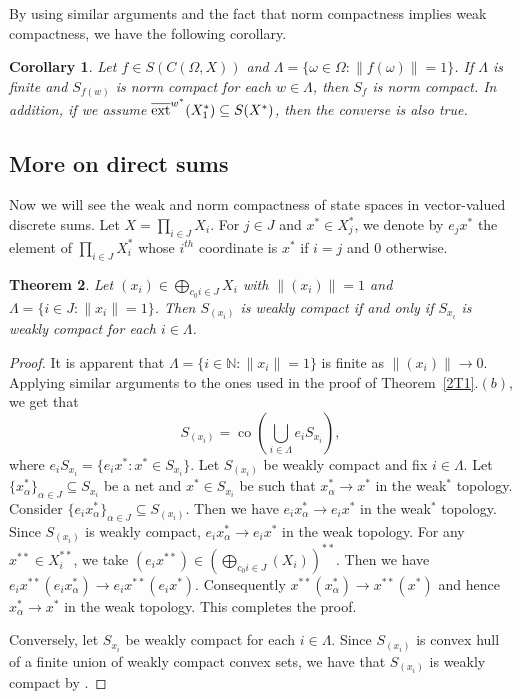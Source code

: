 \documentclass[12pt]{amsart}
\newtheorem{theorem}{Theorem}[section]
\newtheorem{corollary}[theorem]{Corollary}
\theoremstyle{definition}
\numberwithin{equation}{section}
\begin{document}
 By using similar arguments and the fact that norm compactness implies weak compactness, we have the following corollary.
\begin{corollary}
    Let $f \in S(C(\Omega,X))$ and $ \Lambda = \{ \omega \in \Omega : \|f(\omega)\| = 1 \} $. If $ \Lambda $ is finite and $S_{f(w)}$ is norm compact for each $w\in \Lambda$, then $ S_f $ is norm compact. In addition, if we assume $\overline{\textnormal{ext}}^{w^*}{(X_{1}^*)}\subseteq S(X^*)$, then the converse is also true.
\end{corollary}
\subsection{More on direct sums} Now we will see the weak and norm compactness of state spaces in vector-valued discrete sums. Let $X=\prod_{i\in J}X_{i}$. For $j\in J$ and $x^*\in X_{j}^*$, we denote by $e_{j}x^*$ the element of $\prod_{i\in J}X_{i}^*$ whose $i^{th}$ coordinate is $x^*$ if $i=j$ and $0$ otherwise.
\begin{theorem}
Let $(x_i) \in \bigoplus_{{c_0}{i\in J}}X_{i}$ with $\| (x_i) \| = 1$ and $\Lambda = \{ i \in J : \| x_i \| = 1 \}$. Then $ S_{(x_i)} $ is weakly compact if and only if $ S_{x_i} $ is weakly compact for each $ i \in \Lambda $.
\end{theorem}
\begin{proof}
It is apparent that $\Lambda = \{ i \in \mathbb{N} : \| x_i \| = 1 \}$ is finite as $\|(x_i)\|\rightarrow0$. Applying similar arguments to the ones used in the proof of Theorem~\ref{2T1}.$(b)$, we get that $$S_{(x_i)} = \operatorname{co} \left( \bigcup_{i \in \Lambda} e_iS_{x_i} \right),$$ where $e_iS_{x_i}=\{e_{i}x^*:x^*\in S_{x_{i}}\}$.
Let $S_{(x_i)}$ be weakly compact and fix $i\in \Lambda$. Let $\{x_{\alpha}^*\}_{\alpha\in J}\subseteq S_{x_{i}}$ be a net and $x^*\in S_{x_{i}}$ be such that $x_{\alpha}^*\to x^*$ in the weak$^*$ topology. Consider $\{e_{i}x_{\alpha}^*\}_{\alpha\in J}\subseteq S_{(x_{i})}$. Then we have $e_{i}x_{\alpha}^*\to e_{i}x^*$ in the weak$^*$ topology. Since $S_{(x_i)}$ is weakly compact, $e_{i}x_{\alpha}^*\to e_{i}x^*$ in the weak topology. For any $x^{**}\in X_{i}^{**}$, we take $(e_{i}x^{**})\in (\bigoplus_{c_{0}{i\in J}}(X_{i}))^{**}$. Then we have $e_{i}x^{**}(e_{i}x_{\alpha}^*)\to e_{i}x^{**}(e_{i}x^*)$. Consequently $x^{**}(x_{\alpha}^*)\to x^{**}(x^*)$ and hence $x_{\alpha}^*\to x^*$ in the weak topology. This completes the proof.

Conversely, let $ S_{x_i} $ be weakly compact for each $ i \in \Lambda $. Since $ S_{(x_i)} $ is convex hull of a finite union of weakly compact convex sets, we have that $S_{(x_i)}$ is weakly compact by \cite[Theorem~3.20.$(a)$]{RW}.
\end{proof}
\end{document}
